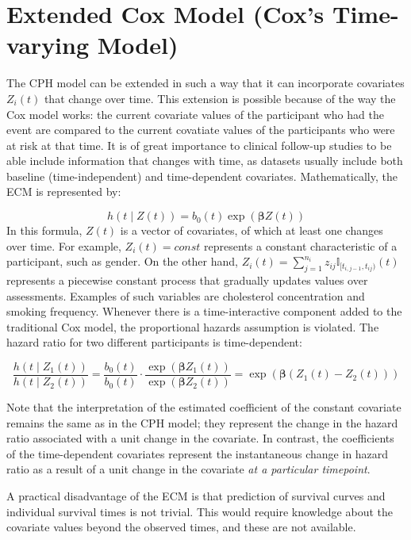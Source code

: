 \section{Extended Cox Model (Cox's Time-varying Model)}
\label{section:methodology:ecm}
The CPH model can be extended in such a way that it can incorporate covariates $Z_i(t)$ that change over time. This extension is possible because of the way the Cox model works: the current covariate values of the participant who had the event are compared to the current covatiate values of the participants who were at risk at that time. It is of great importance to clinical follow-up studies to be able include information that changes with time, as datasets usually include both baseline (time-independent) and time-dependent covariates. Mathematically, the ECM is represented by:  

$$
h(t \mid Z(t)) =  b_0(t) \exp(\mathbf{\beta}Z(t)) 
$$
In this formula, $Z(t)$ is a vector of covariates, of which at least one changes over time. For example, $Z_{i}(t) = \textit{const}$ represents a constant characteristic of a participant, such as gender. On the other hand, $Z_i(t) = \sum_{j=1}^{n_i} z_{ij} \mathbb{I}_{[t_{i,j-1}, t_{ij})}(t)$ represents a piecewise constant process that gradually updates values over assessments. Examples of such variables are cholesterol concentration and smoking frequency. Whenever there is a time-interactive component added to the traditional Cox model, the proportional hazards assumption is violated. The hazard ratio for two different participants is time-dependent: 

$$\frac{h(t \mid Z_1(t))}{h(t \mid Z_2(t))} = \frac{b_0(t)}{b_0(t)} \cdot \frac{\exp(\mathbf{\beta}Z_1(t))}{\exp(\mathbf{\beta}Z_2(t))} = \exp(\mathbf{\beta} (Z_1(t) - Z_2(t) )) $$ 

Note that the interpretation of the estimated coefficient of the constant covariate remains the same as in the CPH model; they represent the change in the hazard ratio associated with a unit change in the covariate. In contrast, the coefficients of the time-dependent covariates represent the instantaneous change in hazard ratio as a result of a unit change in the covariate \textit{at a particular timepoint}. %

A practical disadvantage of the ECM is that prediction of survival curves and individual survival times is not trivial. This would require knowledge about the covariate values beyond the observed times, and these are not available. 

